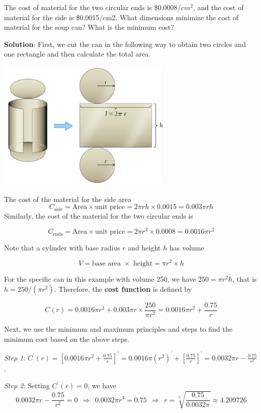 \documentclass[
]{book}
\begin{document}
The cost of material for the two circular ends is \$0.0008/\(cm^2\), and the cost of material for the side is \$0.0015/cm2. What dimensions minimize the cost of material for the soup can? What is the minimum cost?

\textbf{Solution}: First, we cut the can in the following way to obtain two circles and one rectangle and then calculate the total area.

\begin{center}\includegraphics[width=0.5\linewidth]{img09/w09-example052} \end{center}

The cost of the material for the side area
\[
C_{\text{side}} = \text{Area} \times \text{unit price} = 2\pi r h \times 0.0015 = 0.003\pi rh 
\]
Similarly, the cost of the material for the two circular ends is

\[
C_{\text{ends}} = \text{Area} \times \text{unit price} = 2\pi r^2  \times 0.0008 = 0.0016\pi r^2 
\]

Note that a cylinder with base radius \(r\) and height \(h\) has volume

\[
V = \text{base area } \times \text{ height} = \pi r^2 \times h
\]

For the specific can in this example with volume 250, we have \(250 = \pi r^2h\), that is \(h = 250/(\pi r^2)\). Therefore, the \textbf{cost function} is defined by

\[
C(r) = 0.0016\pi r^2 + 0.003\pi r \times \frac{250}{\pi r^2} = 0.0016\pi r^2 + \frac{0.75}{r}
\]

Next, we use the minimum and maximum principles and steps to find the minimum cost based on the above steps.

\emph{Step 1}: \(C^\prime(r) = [0.0016\pi r^2 + \frac{0.75}{r}]^\prime = 0.0016\pi (r^2)^\prime + \left[\frac{0.75}{r}\right]^\prime\)\(=0.0032\pi r -\frac{0.75}{r^2}\).

\emph{Step 2}: Setting \(C^\prime(r) = 0\), we have
\[
0.0032\pi r -\frac{0.75}{r^2} = 0~~\Rightarrow~~0.0032\pi r^3 = 0.75~~\Rightarrow~~ r =\sqrt[3]{\frac{0.75}{0.0032\pi}} \approx 4.209726
\]
\end{document}
